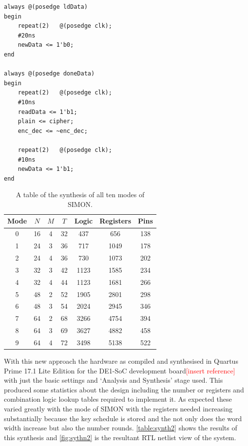 \documentclass[12pt,twoside,a4paper]{report}
\begin{document}
	\begin{minipage}{\linewidth}
	\begin{lstlisting}[label={lst:testbench},caption={The $always$ blocks of the testnches},style=SVStyle]
always @(posedge ldData)
begin
	repeat(2)	@(posedge clk);
	#20ns
	newData <= 1'b0;
end

always @(posedge doneData)
begin
	repeat(2)	@(posedge clk);
	#10ns
	readData <= 1'b1;
	plain <= cipher;
	enc_dec <= ~enc_dec;
	
	repeat(2)	@(posedge clk);
	#10ns
	newData <= 1'b1;
end
	\end{lstlisting}
	\end{minipage}

	\begin{table}[H]
	\centering
	\begin{tabular}{||c|c|c|c|c|c|c||}
		\hline \hline
		Mode  & $N$ & $M$ & $T$ & Logic & Registers & Pins\\
		\hline \hline
		0 & 16 & 4 & 32 & 437 &	656 &	138 \\
		\hline
		1 & 24 & 3 & 36 & 717	& 1049 & 178  \\
		2 & 24 & 4 & 36 & 730 &	1073 & 202  \\
		\hline
		3 & 32 & 3 & 42 & 1123 & 1585 &	234  \\
		4 & 32 & 4 & 44 & 1123 & 1681 &	266	\\
		\hline
		5 & 48 & 2 & 52 & 1905 & 2801 &	298  \\
		6 & 48 & 3 & 54 & 2024 & 2945 & 346 \\
		\hline
		7 & 64 & 2 & 68 & 3266 & 4754 & 394  \\
		8 & 64 & 3 & 69 & 3627 & 4882 & 458 \\
 		9 & 64 & 4 & 72 & 3498 & 5138 &	522 \\
		\hline \hline
	\end{tabular}
	\caption{A table of the synthesis of all ten modes of SIMON.}
	\label{table:synth2}
	\end{table}  
	
	With this new approach the hardware as compiled and synthesised in Quartus Prime 17.1 Lite Edition for the DE1-SoC development board\textcolor{red}{[insert reference]} with just the basic settings and `Analysis and Synthesis' stage used. This produced some statistics about the design including the number or registers and combination logic lookup tables required to implement it. As expected these varied greatly with the mode of SIMON with the registers needed increasing substantially because the key schedule is stored and the not only does the word width increase but also the number rounds. \autoref{table:synth2} shows the results of this synthesis and \autoref{fig:sythn2} is the resultant RTL netlist view of the system.
	    
\end{document}
